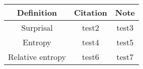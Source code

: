 \begin{center}

\begin{tabular}{c | c | c}
Definition & Citation & Note\\
\hline
\hline
Surprisal & test2 & test3\\
\hline
Entropy &test4 & test5\\
\hline
Relative entropy & test6 & test7

\end{tabular}
    
\end{center}